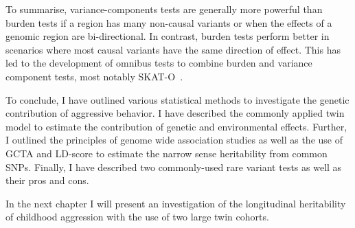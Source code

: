 To summarise, variance-components tests are generally more powerful than burden tests if a region has many non-causal variants or when the effects of a genomic region are bi-directional.
In contrast, burden tests perform better in scenarios where most causal variants have the same direction of effect.
This has led to the development of omnibus tests to combine burden and variance component tests, most notably SKAT-O~\cite{Lee2012}.
\bigskip

To conclude, I have outlined various statistical methods to investigate the genetic contribution of aggressive behavior.
I have described the commonly applied twin model to estimate the contribution of genetic and environmental effects.
Further, I outlined the principles of genome wide association studies as well as the use of GCTA and LD-score to estimate the narrow sense heritability from common SNPs.
Finally, I have described two commonly-used rare variant tests as well as their pros and cons.

In the next chapter I will present an investigation of the longitudinal heritability of childhood aggression with the use of two large twin cohorts. 
